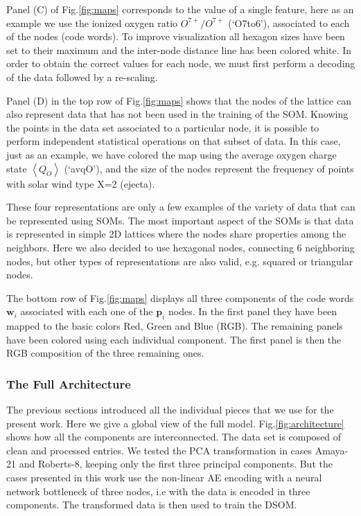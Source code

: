 Panel (C) of Fig.\ref{fig:maps} corresponds to the value of a single feature, here as an example we use the ionized oxygen ratio $O^{7+}/O^{7+}$ (`O7to6'), associated to each of the nodes (code words). To improve visualization all hexagon sizes have been set to their maximum and the inter-node distance line has been colored white. In order to obtain the correct values for each node, we must first perform a decoding of the data followed by a re-scaling.

Panel (D) in the top row of Fig.\ref{fig:maps} shows that the nodes of the lattice can also represent data that has not been used in the training of the SOM. Knowing the points in the data set associated to a particular node, it is possible to perform independent statistical operations on that subset of data. In this case, just as an example, we have colored the map using the average oxygen charge state $\left<Q_{O}\right>$ (`avqO'), and the size of the nodes represent the frequency of points with solar wind type X=2 (ejecta).

These four representations are only a few examples of the variety of data that can be represented using SOMs. The most important aspect of the SOMs is that data is represented in simple 2D lattices where the nodes share properties among the neighbors. Here we also decided to use hexagonal nodes, connecting 6 neighboring nodes, but other types of representations are also valid, e.g. squared or triangular nodes.

The bottom row of Fig.\ref{fig:maps} displays all three components of the code words $\boldsymbol{w}_i$ associated with each one of the $\boldsymbol{p}_i$ nodes. In the first panel they have been mapped to the basic colors Red, Green and Blue (RGB). The remaining panels have been colored using each individual component. The first panel is then the RGB composition of the three remaining ones.

\subsubsection{The Full Architecture}
The previous sections introduced all the individual pieces that we use for the present work. Here we give a global view of the full model. Fig.\ref{fig:architecture} shows how all the components are interconnected. The data set is composed of clean and processed entries. We tested the PCA transformation in cases Amaya-21 and Roberts-8, keeping only the first three principal components. But the cases presented in this work use the non-linear AE encoding with a neural network bottleneck of three nodes, i.e with the data is encoded in three components. The transformed data is then used to train the DSOM.

